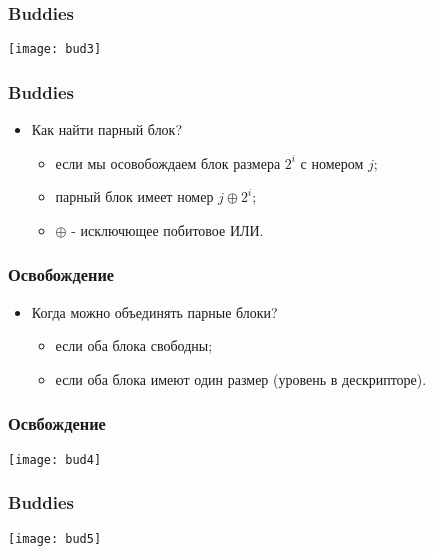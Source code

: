 \begin{frame}
\frametitle{Buddies}
\texttt{[image: bud3]}
\end{frame}

\begin{frame}
\frametitle{Buddies}
\begin{itemize}
    \item<1->Как найти парный блок?
    \begin{itemize}
        \item<1->если мы осовобождаем блок размера $2^i$ с номером $j$;
        \item<2->парный блок имеет номер $j \oplus 2^i$;
	\item<2->$\oplus$ - исключющее побитовое ИЛИ.
    \end{itemize}
\end{itemize}
\end{frame}

\begin{frame}
\frametitle{Освобождение}
\begin{itemize}
    \item<1->Когда можно объединять парные блоки?
    \begin{itemize}
        \item<2->если оба блока свободны;
        \item<3->если оба блока имеют один размер (уровень в дескрипторе).
    \end{itemize}
\end{itemize}
\end{frame}

\begin{frame}
\frametitle{Освбождение}
\texttt{[image: bud4]}
\end{frame}

\begin{frame}
\frametitle{Buddies}
\texttt{[image: bud5]}
\end{frame}
